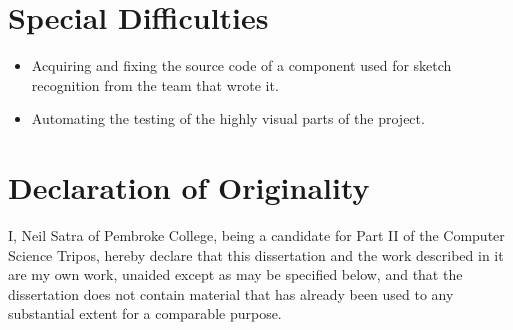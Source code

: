 \section*{Special Difficulties}
\begin{itemize}
	\item Acquiring and fixing the source code of a component used for sketch recognition from the team that wrote it.
	\item Automating the testing of the highly visual parts of the project.
\end{itemize}


\section*{Declaration of Originality}

I, Neil Satra of Pembroke College, being a candidate for Part II of the Computer Science Tripos, hereby declare that this dissertation and the work described in it are my own work, unaided except as may be specified below, and that the dissertation does not contain material that has already been used to any substantial extent for a comparable purpose.

\bigskip
{}

\medskip
{}


\clearpage